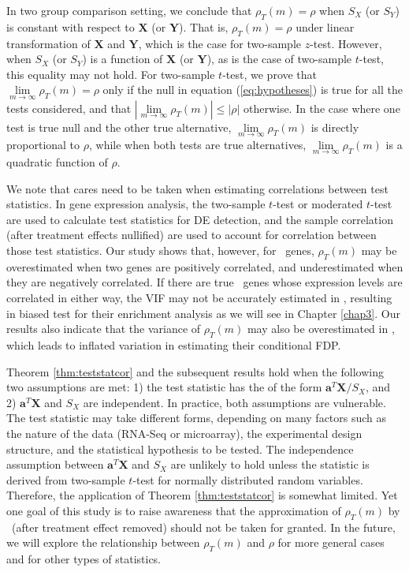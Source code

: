 In two group comparison setting, we conclude that $\rho_T(m) = \rho$ when $S_X$ (or $S_Y$) is 
constant with respect to $\bm X$ (or $\bm Y$). That is, $\rho_T(m) = \rho$ under linear 
transformation of $\bm X$ and $\bm Y$, which is the case for two-sample $z$-test. However, when 
$S_X$ (or $S_Y$) is a function of $\bm X$ (or $\bm Y$), as is the case of two-sample $t$-test, this 
equality may not hold. For two-sample $t$-test, we prove that 
$\lim\limits_{m\rightarrow\infty}\rho_T(m)=\rho$ only if the null in equation (\ref{eq:hypotheses}) 
is true for all the tests 
considered, and that $|\lim\limits_{m\rightarrow\infty}\rho_T(m)|\leq |\rho|$ otherwise. In the 
case where one test is true null 
and the other true alternative, $\lim\limits_{m\rightarrow\infty}\rho_T(m)$ is directly 
proportional to $\rho$, while when both 
tests are true alternatives, $\lim\limits_{m\rightarrow\infty}\rho_T(m)$ is a quadratic function of 
$\rho$.

We note that cares need to be taken when estimating correlations between test statistics.
In gene expression analysis, the two-sample $t$-test \citep{barry2008statistical, 
	efron2007correlation,qiu2005correlation} or moderated 
$t$-test \citep{wu2012camera} are used to calculate test statistics for DE detection, and the 
sample correlation (after treatment effects 
nullified) are used to account for correlation between those test statistics.
Our study shows that, however, for \DED~genes, $\rho_T(m)$ may be 
overestimated when
two genes are positively correlated, and underestimated when they are negatively correlated. If 
there are true \DED~genes whose expression 
levels are correlated in either way, the VIF may not be accurately estimated in 
\citet{wu2012camera}, resulting in biased test
for their enrichment analysis as we will see in Chapter \ref{chap3}. Our results also indicate 
that the variance of 
$\rho_T(m)$ may also be overestimated in
\citet{efron2007correlation}, which leads to inflated variation in estimating their conditional 
FDP.

Theorem \ref{thm:teststatcor} and the subsequent results hold when the following two 
assumptions are met: 1) the test statistic has the of 
the form $\bm a^T\bm X/S_X$, and 2) $\bm a^T\bm X$ and $S_X$ are independent. In practice, both 
assumptions are vulnerable.
The test statistic may take different forms, depending on many factors such as the nature of 
the data (RNA-Seq or microarray), the 
experimental design structure, and the statistical hypothesis to be tested. The independence 
assumption between $\bm a^T\bm X$ and $S_X$ are 
unlikely to hold unless the statistic is derived from two-sample $t$-test for normally 
distributed random variables. Therefore, the 
application of Theorem \ref{thm:teststatcor} is somewhat limited. Yet one goal of this study is 
to raise awareness that the approximation of $\rho_T(m)$ by \samplecor~(after treatment effect 
removed) should not be taken for 
granted. In the future, we will explore the relationship 
between $\rho_T(m)$ and $\rho$ for more general cases and for other types of statistics. 

